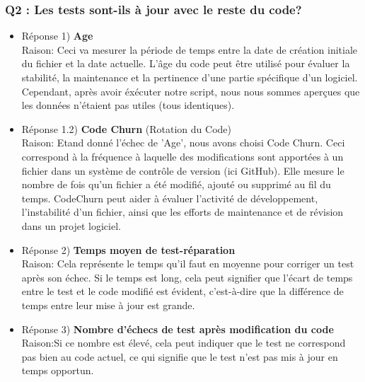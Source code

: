 \documentclass{proc}
\begin{document}
\subsubsection*{Q2 : Les tests sont-ils à jour avec le reste du code?}
\begin{itemize}
   \item Réponse 1) \textbf{Age}
   \\Raison: Ceci va mesurer la période de temps entre la date de création initiale du fichier et la date actuelle. L'âge du code peut être utilisé pour évaluer la stabilité, la maintenance et la pertinence d'une partie spécifique d'un logiciel. Cependant, après avoir éxécuter notre script, nous nous sommes aperçues que les données n'étaient pas utiles (tous identiques).

   \item Réponse 1.2) \textbf{\cite{CodeChurn}Code Churn} (Rotation du Code)
   \\Raison: Etand donné l'échec de 'Age', nous avons choisi Code Churn. Ceci correspond à la fréquence à laquelle des modifications sont apportées à un fichier dans un système de contrôle de version (ici GitHub). Elle mesure le nombre de fois qu'un fichier a été modifié, ajouté ou supprimé au fil du temps. CodeChurn peut aider à évaluer l'activité de développement, l'instabilité d'un fichier, ainsi que les efforts de maintenance et de révision dans un projet logiciel.
   
   \item Réponse 2) \textbf{Temps moyen de test-réparation}
   \\Raison: 
   Cela représente le temps qu'il faut en moyenne pour corriger un test après son échec. Si le temps est long, cela peut signifier que l'écart de temps entre le test et le code modifié est évident, c'est-à-dire que la différence de temps entre leur mise à jour est grande.
   \item Réponse 3) \textbf{Nombre d'échecs de test après modification du code}
   \\Raison:Si ce nombre est élevé, cela peut indiquer que le test ne correspond pas bien au code actuel, ce qui signifie que le test n'est pas mis à jour en temps opportun.
\end{itemize}
\end{document}
